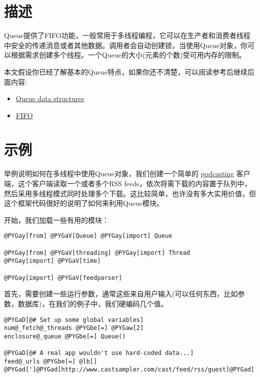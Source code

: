 \documentclass[a4paper,10pt,english]{manual}
\begin{document}
\section{描述}

Queue提供了FIFO功能，一般常用于多线程编程，它可以在生产者和消费者线程中安全的传递消息或者其他数据。调用者会自动创建锁，当使用Queue对象，你可以根据需求创建多个线程。一个Queue的大小(元素的个数)受可用内存的限制。

本文假设你已经了解基本的Queue特点，如果你还不清楚，可以阅读参考后继续后面内容:
\begin{itemize}
\item {} 
\href{http://en.wikipedia.org/wiki/Queue\_\%28data\_structure}{Queue data structures}

\item {} 
\href{http://en.wikipedia.org/wiki/FIFO}{FIFO}

\end{itemize}


\section{示例}

举例说明如何在多线程中使用Queue对象，我们创建一个简单的 \href{http://en.wikipedia.org/wiki/Podcasting}{podcasting} 客户端，这个客户端读取一个或者多个RSS feeds，依次将需下载的内容置于队列中，然后采用多线程模式同时处理多个下载。这比较简单，也许没有多大实用价值，但这个框架代码很好的说明了如何来利用Queue模块。

开始，我们加载一些有用的模块：

\begin{Verbatim}[commandchars=@\[\]]
@PYGay[from] @PYGaV[Queue] @PYGay[import] Queue

@PYGay[from] @PYGaV[threading] @PYGay[import] Thread
@PYGay[import] @PYGaV[time]

@PYGay[import] @PYGaV[feedparser]
\end{Verbatim}

首先，需要创建一些运行参数，通常这些来自用户输入(可以任何东西，比如参数，数据库)，在我们的例子中，我们硬编码几个值。

\begin{Verbatim}[commandchars=@\[\]]
@PYGaD[@# Set up some global variables]
num@_fetch@_threads @PYGbe[=] @PYGaw[2]
enclosure@_queue @PYGbe[=] Queue()

@PYGaD[@# A real app wouldn't use hard-coded data...]
feed@_urls @PYGbe[=] @lb[] @PYGad[']@PYGad[http://www.castsampler.com/cast/feed/rss/guest]@PYGad['],@rb[]
\end{Verbatim}
\end{document}
